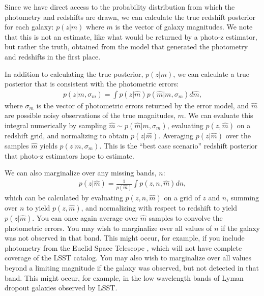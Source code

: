 \documentclass[twocolumn,twocolappendix]{aastex631}
\begin{document}
Since we have direct access to the probability distribution from which the photometry and redshifts are drawn, we can calculate the true redshift posterior for each galaxy: $p(z|m)$ where $m$ is the vector of galaxy magnitudes.
We note that this is not an estimate, like what would be returned by a photo-z estimator, but rather the truth, obtained from the model that generated the photometry and redshifts in the first place.

In addition to calculating the true posterior, $p(z|m)$, we can calculate a true posterior that is consistent with the photometric errors:
\begin{align}
    p(z|m, \sigma_m) = \int p(z|\hat{m}) p(\hat{m}|m, \sigma_m) d\hat{m},
    \label{eq:err-conv}
\end{align}
where $\sigma_m$ is the vector of photometric errors returned by the error model, and $\hat{m}$ are possible noisy observations of the true magnitudes, $m$.
We can evaluate this integral numerically by sampling $\hat{m} \sim p(\hat{m}|m, \sigma_m)$, evaluating $p(z, \hat{m})$ on a redshift grid, and normalizing to obtain $p(z|\hat{m})$.
Averaging $p(z|\hat{m})$ over the samples $\hat{m}$ yields $p(z|m, \sigma_m)$.
This is the ``best case scenario'' redshift posterior that photo-z estimators hope to estimate.

We can also marginalize over any missing bands, $n$:
\begin{align}
    p(z|\hat{m}) = \frac{1}{p(\hat{m})} \int p(z, n, \hat{m}) dn,
\end{align}
which can be calculated by evaluating $p(z, n, \hat{m})$ on a grid of $z$ and $n$, summing over $n$ to yield $p(z, \hat{m})$, and normalizing with respect to redshift to yield $p(z|\hat{m})$.
You can once again average over $\hat{m}$ samples to convolve the photometric errors.
You may wish to marginalize over all values of $n$ if the galaxy was not observed in that band.
This might occur, for example, if you include photometry from the Euclid Space Telescope \citep{euclid}, which will not have complete coverage of the LSST catalog.
You may also wish to marginalize over all values beyond a limiting magnitude if the galaxy was observed, but not detected in that band.
This might occur, for example, in the low wavelength bands of Lyman dropout galaxies observed by LSST.
\end{document}
